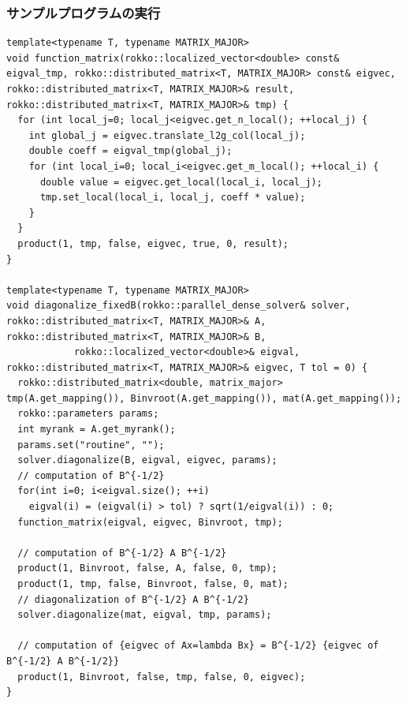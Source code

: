 \begin{frame}[c,fragile]
  \frametitle{サンプルプログラムの実行}

\begin{lstlisting}
template<typename T, typename MATRIX_MAJOR>
void function_matrix(rokko::localized_vector<double> const& eigval_tmp, rokko::distributed_matrix<T, MATRIX_MAJOR> const& eigvec, rokko::distributed_matrix<T, MATRIX_MAJOR>& result, rokko::distributed_matrix<T, MATRIX_MAJOR>& tmp) {
  for (int local_j=0; local_j<eigvec.get_n_local(); ++local_j) {
    int global_j = eigvec.translate_l2g_col(local_j);
    double coeff = eigval_tmp(global_j);
    for (int local_i=0; local_i<eigvec.get_m_local(); ++local_i) {
      double value = eigvec.get_local(local_i, local_j);
      tmp.set_local(local_i, local_j, coeff * value); 
    }
  }
  product(1, tmp, false, eigvec, true, 0, result);
}

template<typename T, typename MATRIX_MAJOR>
void diagonalize_fixedB(rokko::parallel_dense_solver& solver, rokko::distributed_matrix<T, MATRIX_MAJOR>& A, rokko::distributed_matrix<T, MATRIX_MAJOR>& B,
			rokko::localized_vector<double>& eigval, rokko::distributed_matrix<T, MATRIX_MAJOR>& eigvec, T tol = 0) {
  rokko::distributed_matrix<double, matrix_major> tmp(A.get_mapping()), Binvroot(A.get_mapping()), mat(A.get_mapping());
  rokko::parameters params;
  int myrank = A.get_myrank();
  params.set("routine", "");
  solver.diagonalize(B, eigval, eigvec, params);
  // computation of B^{-1/2}
  for(int i=0; i<eigval.size(); ++i)
    eigval(i) = (eigval(i) > tol) ? sqrt(1/eigval(i)) : 0;
  function_matrix(eigval, eigvec, Binvroot, tmp);
  
  // computation of B^{-1/2} A B^{-1/2}
  product(1, Binvroot, false, A, false, 0, tmp);
  product(1, tmp, false, Binvroot, false, 0, mat);
  // diagonalization of B^{-1/2} A B^{-1/2}
  solver.diagonalize(mat, eigval, tmp, params);

  // computation of {eigvec of Ax=lambda Bx} = B^{-1/2} {eigvec of B^{-1/2} A B^{-1/2}}
  product(1, Binvroot, false, tmp, false, 0, eigvec);
}
\end{lstlisting}
\end{frame}



